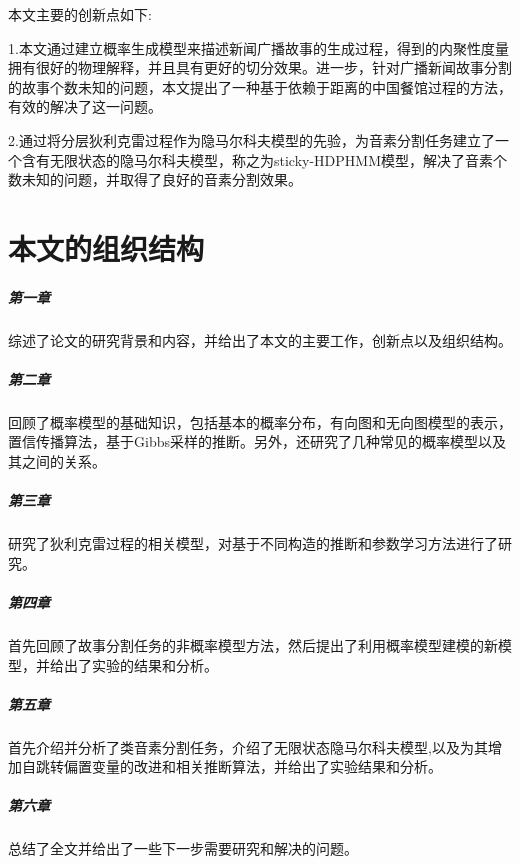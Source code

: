 \vspace{25pt}
本文主要的创新点如下:

1.本文通过建立概率生成模型来描述新闻广播故事的生成过程，得到的内聚性度量拥有很好的物理解释，并且具有更好的切分效果。进一步，针对广播新闻故事分割的故事个数未知的问题，本文提出了一种基于依赖于距离的中国餐馆过程的方法，有效的解决了这一问题。

2.通过将分层狄利克雷过程作为隐马尔科夫模型的先验，为音素分割任务建立了一个含有无限状态的隐马尔科夫模型，称之为sticky-HDPHMM模型，解决了音素个数未知的问题，并取得了良好的音素分割效果。


\section{本文的组织结构}
\subparagraph{第一章} 综述了论文的研究背景和内容，并给出了本文的主要工作，创新点以及组织结构。
\subparagraph{第二章} 回顾了概率模型的基础知识，包括基本的概率分布，有向图和无向图模型的表示，置信传播算法，基于Gibbs采样的推断。另外，还研究了几种常见的概率模型以及其之间的关系。
\subparagraph{第三章} 研究了狄利克雷过程的相关模型，对基于不同构造的推断和参数学习方法进行了研究。
\subparagraph{第四章} 首先回顾了故事分割任务的非概率模型方法，然后提出了利用概率模型建模的新模型，并给出了实验的结果和分析。
\subparagraph{第五章} 首先介绍并分析了类音素分割任务，介绍了无限状态隐马尔科夫模型,以及为其增加自跳转偏置变量的改进和相关推断算法，并给出了实验结果和分析。
\subparagraph{第六章} 总结了全文并给出了一些下一步需要研究和解决的问题。